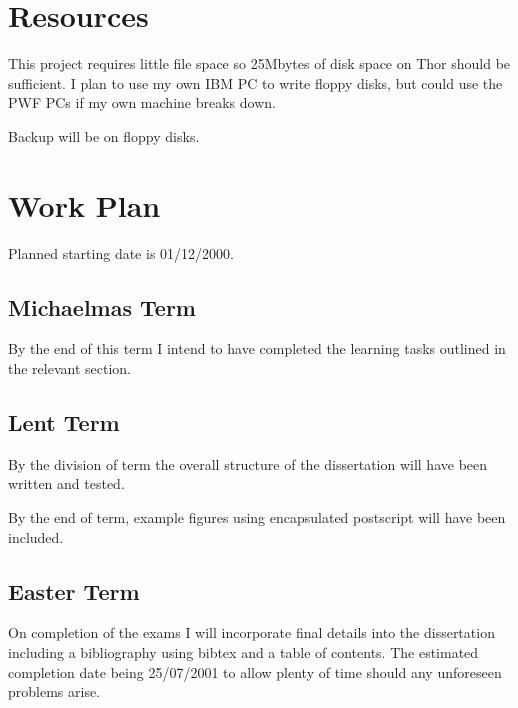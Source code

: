 \section*{Resources}

This project requires little file space so 25Mbytes of disk space on Thor
should be sufficient. I plan to use my own IBM PC to write floppy disks, 
but could use the PWF PCs if my own machine breaks down. 

Backup will be on floppy disks.

\section*{Work Plan}

Planned starting date is 01/12/2000.

\subsection*{Michaelmas Term} 

By the end of this term I intend to have completed the learning tasks 
outlined in the relevant section.


\subsection*{Lent Term}

By the division of term the overall structure of the dissertation
will have been written and tested.

By the end of term, example figures using encapsulated postscript
will have been included.
 

\subsection*{Easter Term}

On completion of the exams I will incorporate final details into 
the dissertation including a bibliography using bibtex and a table of contents.
The estimated completion date being 25/07/2001 to allow 
plenty of time should any unforeseen problems arise.


